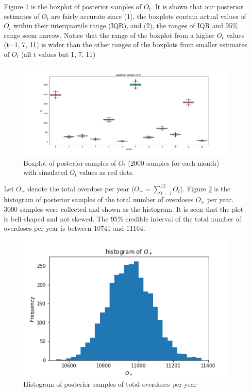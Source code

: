 \documentclass[12pt]{article}
\begin{document}
{Figure \ref{pst_ot} is the boxplot of posterior samples of $O_t$. It is shown that our posterior estimates of  $O_t$ are fairly accurate since (1), the boxplots contain actual values of $O_t$ within their interquartile range (IQR), and (2), the ranges of IQR and 95\% range seem narrow. Notice that the range of the boxplot from a higher $O_t$ values (t=1, 7, 11) is wider than the other ranges of the boxplots from smaller estimates of $O_t$ (all t values but 1, 7, 11)\\

\begin{figure}[h]
	\centering
	\includegraphics[width=1\linewidth]{Figures/earlyresult1_ot.png}
	\caption[Initial result: boxplot of posterior samples of $O_t$]{Boxplot of posterior samples of $O_t$ (2000 samples for each month) with simulated $O_t$ values as red dots.}
	\label{pst_ot}
\end{figure}

Let $O_+$ denote the total overdose per year ($O_+ = \sum_{t=1}^{12}O_t $). Figure \ref{hst_ot} is the histogram of posterior samples of the total number of overdoses $O_+$ per year. 3000 samples were collected and shown as the histogram.  It is seen that the plot is bell-shaped and not skewed. The 95\% credible interval of the total number of overdoses per year is between 10741 and 11164.\\

\begin{figure}[h]
	\centering
	\includegraphics[width=1\linewidth]{Figures/hist_sum_ot.png}
	\caption[Initial result: histogram of posterior samples of total overdoses per year]{Histogram of posterior samples of total overdoses per year}
	\label{hst_ot}
\end{figure}

}
\end{document}
